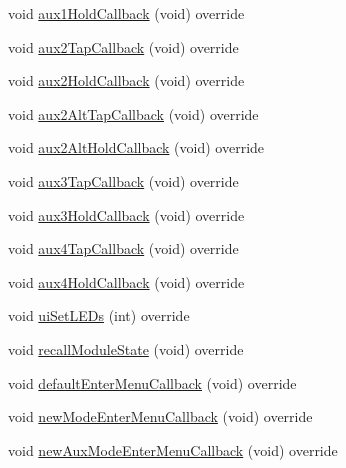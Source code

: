 \begin{DoxyCompactItemize}
\item 
void \mbox{\hyperlink{class_via_scanner_1_1_via_scanner_u_i_a634c06fae2a1a17e5f3737dd44b34e10}{aux1\+Hold\+Callback}} (void) override
\item 
void \mbox{\hyperlink{class_via_scanner_1_1_via_scanner_u_i_a7d3aad2399479925618df242bc5b1f42}{aux2\+Tap\+Callback}} (void) override
\item 
void \mbox{\hyperlink{class_via_scanner_1_1_via_scanner_u_i_a929ba662a65fd62f9c5b122accad48a4}{aux2\+Hold\+Callback}} (void) override
\item 
void \mbox{\hyperlink{class_via_scanner_1_1_via_scanner_u_i_aa862c7243959f99bfd42995102ffcdf5}{aux2\+Alt\+Tap\+Callback}} (void) override
\item 
void \mbox{\hyperlink{class_via_scanner_1_1_via_scanner_u_i_ae1947196ca5cb248c4bc177f02cb20f5}{aux2\+Alt\+Hold\+Callback}} (void) override
\item 
void \mbox{\hyperlink{class_via_scanner_1_1_via_scanner_u_i_a7d15083a3565f56b4b70ac497fddd563}{aux3\+Tap\+Callback}} (void) override
\item 
void \mbox{\hyperlink{class_via_scanner_1_1_via_scanner_u_i_ac79b09eb94d39065b6b5061d34746862}{aux3\+Hold\+Callback}} (void) override
\item 
void \mbox{\hyperlink{class_via_scanner_1_1_via_scanner_u_i_a8c20c03c838257da356f0071dfcbfd36}{aux4\+Tap\+Callback}} (void) override
\item 
void \mbox{\hyperlink{class_via_scanner_1_1_via_scanner_u_i_af994cf63aa7becc41c9e3dcb2e08d8c2}{aux4\+Hold\+Callback}} (void) override
\item 
void \mbox{\hyperlink{class_via_scanner_1_1_via_scanner_u_i_aa2c3ca7904d9036eb362c7600dac66b0}{ui\+Set\+L\+E\+Ds}} (int) override
\item 
void \mbox{\hyperlink{class_via_scanner_1_1_via_scanner_u_i_a9513c8ecc955ccfbdaebea4172deb210}{recall\+Module\+State}} (void) override
\item 
void \mbox{\hyperlink{class_via_scanner_1_1_via_scanner_u_i_adc8f206d1050c457af29a45cf8050faf}{default\+Enter\+Menu\+Callback}} (void) override
\item 
void \mbox{\hyperlink{class_via_scanner_1_1_via_scanner_u_i_a15124d20f2684fd9c5d1c83d41a15e5a}{new\+Mode\+Enter\+Menu\+Callback}} (void) override
\item 
void \mbox{\hyperlink{class_via_scanner_1_1_via_scanner_u_i_a8176484cc1deb6df08abfe1f0c1f789f}{new\+Aux\+Mode\+Enter\+Menu\+Callback}} (void) override
\item 

\end{DoxyCompactItemize}
